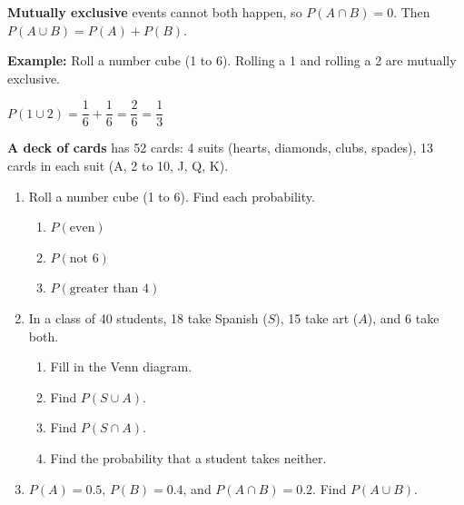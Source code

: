 \documentclass[11pt]{article}
\begin{document}
\vspace{0.8em}
\textbf{Mutually exclusive} events cannot both happen, so $P(A \cap B) = 0$. Then $P(A \cup B) = P(A) + P(B)$.

\vspace{0.2em}
\textbf{Example:} Roll a number cube (1 to 6). Rolling a 1 and rolling a 2 are mutually exclusive.
\par $P(1 \cup 2) = \dfrac{1}{6} + \dfrac{1}{6} = \dfrac{2}{6} = \dfrac{1}{3}$

\vspace{0.8em}
\textbf{A deck of cards} has 52 cards: 4 suits (hearts, diamonds, clubs, spades), 13 cards in each suit (A, 2 to 10, J, Q, K).

\partner

\newpage
\begin{enumerate}

\item Roll a number cube (1 to 6). Find each probability.
\begin{enumerate}[itemsep=1.4em]
  \item $P(\text{even})$ 
  \item $P(\text{not } 6)$ 
  \item $P(\text{greater than } 4)$ 
\end{enumerate}
\work{1em}

\item In a class of 40 students, 18 take Spanish ($S$), 15 take art ($A$), and 6 take both.
\begin{enumerate}[itemsep=1em]
  \item Fill in the Venn diagram.

  \begin{center}\end{center}
  \item Find $P(S \cup A)$. 
  \work{1.5em}
  \item Find $P(S \cap A)$. 
  \item Find the probability that a student takes neither. 
\end{enumerate}
\work{1em}

\item $P(A) = 0.5$, \; $P(B) = 0.4$, and $P(A \cap B) = 0.2$. Find $P(A \cup B)$.


\end{enumerate}
\end{document}
